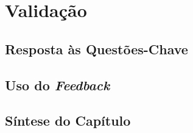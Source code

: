 \chapter{Validação}
\label{chap:Chapter6}
\tbd

\section{Resposta às Questões-Chave}
\label{sec:chap06_answers}
\tbd

\section{Uso do \textit{Feedback}}
\label{sec:chap06_feedback_usage}
\tbd

\section{Síntese do Capítulo}
\label{sec:chap06_chaptersummary}
\tbd
